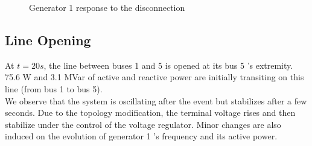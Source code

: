 \documentclass[a4paper, 12pt]{report}
\begin{document}
\begin{figure}[H]
\caption{Generator 1 response to the disconnection}
\end{figure}

\newpage
\subsection{Line Opening}
\label{DisconnectLine}

At $t=20s$, the line between buses 1 and 5 is opened at its bus 5 's extremity. 75.6 W and 3.1 MVar of active and reactive power are initially transiting on this line (from bus 1 to bus 5).\\

We observe that the system is oscillating after the event but stabilizes after a few seconds. Due to the topology modification, the terminal voltage rises and then stabilize under the control of the voltage regulator. Minor changes are also induced on the evolution of generator 1 's frequency and its active power.\\
\end{document}
